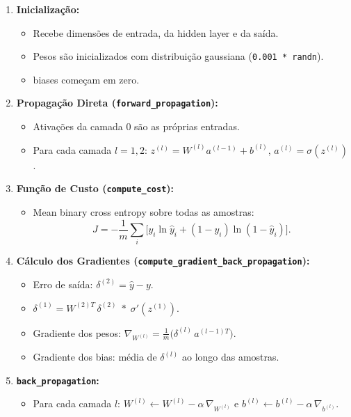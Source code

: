 \documentclass[a4paper,12pt]{article}
\begin{document}
\begin{enumerate}
    \item \textbf{Inicialização:}
    \begin{itemize}
        \item Recebe dimensões de entrada, da hidden layer e da saída.
        \item Pesos são inicializados com distribuição gaussiana (\texttt{0.001 * randn}).
        \item biases começam em zero.
    \end{itemize}

    \item \textbf{Propagação Direta (\texttt{forward\_propagation}):}
    \begin{itemize}
        \item Ativações da camada 0 são as próprias entradas.
        \item Para cada camada $l=1,2$: $z^{(l)} = W^{(l)} a^{(l-1)} + b^{(l)}$,
        $a^{(l)} = \sigma(z^{(l)})$.
    \end{itemize}

    \item \textbf{Função de Custo (\texttt{compute\_cost}):}
    \begin{itemize}
        \item Mean binary cross entropy sobre todas as amostras:
        \[ J = -\frac{1}{m} \sum_i \bigl[y_i \ln \hat y_i + (1-y_i)\ln(1-\hat y_i)\bigr]. \]
    \end{itemize}

    \item \textbf{Cálculo dos Gradientes (\texttt{compute\_gradient\_back\_propagation}):}
    \begin{itemize}
        \item Erro de saída: $\delta^{(2)} = \hat y - y$.
        \item $\delta^{(1)} = W^{(2)\!T}\,\delta^{(2)} \;\ast\; \sigma'(z^{(1)})$.
        \item Gradiente dos pesos: $\nabla_{W^{(l)}} = \frac{1}{m} \bigl(\delta^{(l)}\,a^{(l-1)T}\bigr)$.
        \item Gradiente dos bias: média de $\delta^{(l)}$ ao longo das amostras.
    \end{itemize}

    \item \textbf{\texttt{back\_propagation}:}
    \begin{itemize}
        \item Para cada camada $l$:
        $W^{(l)} \gets W^{(l)} - \alpha\,\nabla_{W^{(l)}}$ e
        $b^{(l)} \gets b^{(l)} - \alpha\,\nabla_{b^{(l)}}$.
    \end{itemize}
\end{enumerate}
\end{document}
